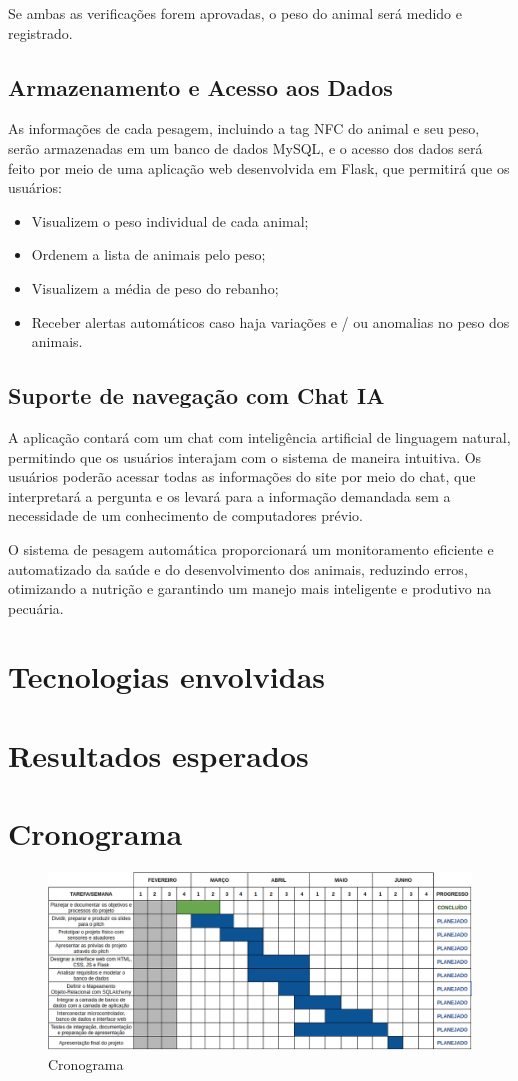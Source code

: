 \documentclass[11pt]{article}
\begin{document}
Se ambas as verificações forem aprovadas, o peso do animal será medido e registrado.

\subsection{Armazenamento e Acesso aos Dados}
As informações de cada pesagem, incluindo a tag NFC do animal e seu peso, serão armazenadas em um banco de dados MySQL, e o acesso dos dados será feito por meio de uma aplicação web desenvolvida em Flask, que permitirá que os usuários:

\begin{itemize}
    \item Visualizem o peso individual de cada animal;
    \item Ordenem a lista de animais pelo peso;
    \item Visualizem a média de peso do rebanho;
    \item Receber alertas automáticos caso haja variações e / ou anomalias no peso dos animais.
\end{itemize}

\subsection{Suporte de navegação com Chat IA}
A aplicação contará com um chat com inteligência artificial de linguagem natural, permitindo que os usuários interajam com o sistema de maneira intuitiva. Os usuários poderão acessar todas as informações do site por meio do chat, que interpretará a pergunta e os levará para a informação demandada sem a necessidade de um conhecimento de computadores prévio.

O sistema de pesagem automática proporcionará um monitoramento eficiente e automatizado da saúde e do desenvolvimento dos animais, reduzindo erros, otimizando a nutrição e garantindo um manejo mais inteligente e produtivo na pecuária.

\section{Tecnologias envolvidas}
\section{Resultados esperados}
\section{Cronograma}

\begin{figure}[H]
    \centering
    \includegraphics[width=0.9\linewidth]{cronograma.png}
    \caption{Cronograma}
\end{figure}



\end{document}
